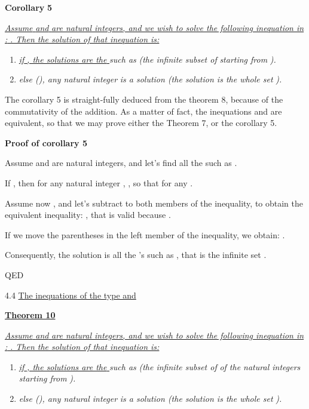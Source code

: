 \documentclass{article}
\providecommand{\tightlist}{%
  \setlength{\itemsep}{0pt}\setlength{\parskip}{0pt}}
\begin{document}
\textbf{Corollary }\textbf{5}

\ul{\emph{Assume }}\ul{\emph{ and }}\ul{\emph{ are natural integers, and we wish to solve the following inequation in }}\ul{\emph{: }}\ul{\emph{. Then the solution of that inequation is:}}

\begin{enumerate}
\tightlist
\item \ul{\emph{if }}\ul{\emph{, the solutions are the }}\emph{ such as }\emph{ (the infinite subset of }\emph{ starting from }\emph{).}
\item \emph{else (}\emph{), any natural integer }\emph{ is a solution (the solution is the whole set }\emph{).}
\end{enumerate}

The corollary 5 is straight-fully deduced from the theorem 8, because of the commutativity of the addition. As a matter of fact, the inequations  and  are equivalent, so that we may prove either the Theorem 7, or the corollary 5.

\textbf{Proof of corollary 5}

Assume  and  are natural integers, and let’s find all the  such as .

If , then for any natural integer , , so that  for any .

Assume now , and let’s subtract  to both members of the inequality, to obtain the equivalent inequality: , that is valid because .

If we move the parentheses in the left member of the inequality, we obtain: .

Consequently, the solution is all the ’s such as , that is the infinite set .

QED

4.4 \ul{The inequations of the type }\ul{ and }

\ul{\textbf{Theorem 10}}

\ul{\emph{Assume }}\ul{\emph{ and }}\ul{\emph{ are natural integers, and we wish to solve the following inequation in }}\ul{\emph{: }}\ul{\emph{. Then the solution of that inequation is:}}

\begin{enumerate}
\tightlist
\item \ul{\emph{if }}\ul{\emph{, the solutions are the }}\emph{ such as }\emph{ (the infinite subset of }\emph{ of the natural integers starting from }\emph{).}
\item \emph{else (}\emph{), any natural integer }\emph{ is a solution (the solution is the whole set }\emph{).}
\end{enumerate}
\end{document}
